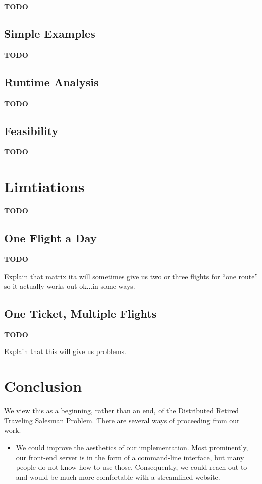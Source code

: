 \documentclass{article}
\begin{document}
{\bf TODO}

\subsection{Simple Examples}
{\bf TODO}

\subsection{Runtime Analysis}
{\bf TODO}

\subsection{Feasibility}
{\bf TODO}


\section{Limtiations}\label{sec:limitations}

{\bf TODO}

\subsection{One Flight a Day}
{\bf TODO}

Explain that matrix ita will sometimes give us two or three flights for ``one route'' so it actually works out ok...in some ways.

\subsection{One Ticket, Multiple Flights}
{\bf TODO}

Explain that this will give us problems.

\section{Conclusion}\label{sec:conclusion}

We view this as a beginning, rather than an end, of the Distributed Retired Traveling Salesman Problem. There are several ways of proceeding from our
work.

\begin{itemize}\label{noitemsep}
    \item We could improve the aesthetics of our implementation. Most prominently, our front-end server is in the form of a command-line interface,
    but many people do not know how to use those. Consequently, we could reach out to and would be much more comfortable with a streamlined website.
\end{itemize}
\end{document}
